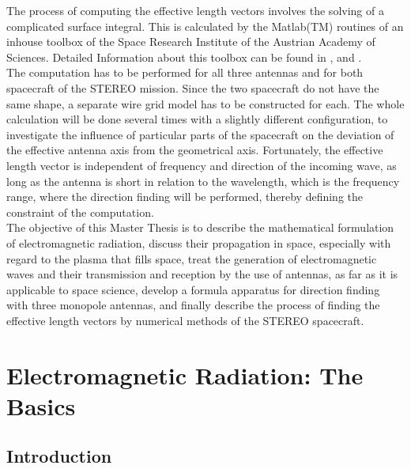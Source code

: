 \documentclass[a4paper,14pt]{extbook}
\begin{document}
The process of computing the effective length vectors involves the solving of a complicated surface integral. This is calculated by the Matlab(TM) routines of an inhouse toolbox of the Space Research Institute of the Austrian Academy of Sciences. Detailed Information about this toolbox can be found in \cite{toolbox}, \cite{toolbox2}
and \cite{antenna_report_1} .\\

The computation has to be performed for all three antennas and for both spacecraft of the STEREO mission. Since the two spacecraft do not have the same shape, a separate wire grid model has to be constructed for each. The whole calculation will be done several times with a slightly different configuration, to investigate the influence of particular parts of the spacecraft on the deviation of the effective antenna axis from the geometrical axis. Fortunately, the effective length vector is independent of frequency and direction of the incoming wave, as long as the antenna is short in relation to the wavelength, which is the frequency range, where the direction finding will be performed, thereby defining the constraint of the computation.\\

The objective of this Master Thesis is to describe the mathematical formulation of electromagnetic radiation, discuss their propagation in space, especially with regard to the plasma that fills space, treat the generation of electromagnetic waves and their transmission and reception by the use of antennas, as far as it is applicable to space science, develop a formula apparatus for direction finding with three monopole antennas, and finally describe the process of finding the effective length vectors by numerical methods of the STEREO spacecraft. \\

\chapter{Electromagnetic Radiation: The Basics}

\section{Introduction}
\end{document}
